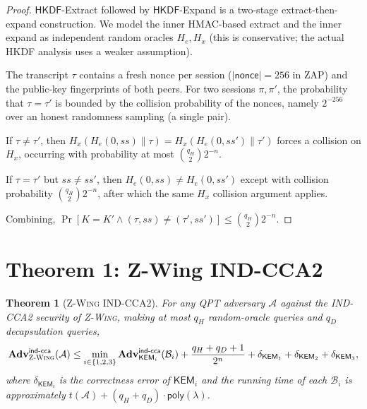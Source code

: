 \documentclass[11pt,a4paper]{article}
\newtheorem{theorem}{Theorem}
\theoremstyle{definition}
\theoremstyle{remark}
\newcommand{\KEM}{\ensuremath{\mathsf{KEM}}}
\newcommand{\Adv}{\ensuremath{\mathbf{Adv}}}
\newcommand{\zwing}{\textsc{Z-Wing}}
\newcommand{\zap}{\textsc{ZAP}}
\newcommand{\hkdf}{\ensuremath{\mathsf{HKDF}}}
\begin{document}
\begin{proof}
$\hkdf$-Extract followed by $\hkdf$-Expand is a two-stage extract-then-expand
construction. We model the inner HMAC-based extract and the inner expand as
independent random oracles $H_e, H_x$ (this is conservative; the actual
HKDF analysis \cite{krawczyk2010hkdf} uses a weaker assumption).

The transcript $\tau$ contains a fresh nonce per session
($|\mathsf{nonce}| = 256$ in \zap{}) and the public-key fingerprints of both
peers. For two sessions $\pi, \pi'$, the probability that
$\tau = \tau'$ is bounded by the collision probability of the nonces, namely
$2^{-256}$ over an honest randomness sampling (a single pair).

If $\tau \neq \tau'$, then $H_x(H_e(0, ss) \parallel \tau) = H_x(H_e(0, ss') \parallel \tau')$
forces a collision on $H_x$, occurring with probability at most
$\binom{q_H}{2} 2^{-n}$.

If $\tau = \tau'$ but $ss \neq ss'$, then $H_e(0, ss) \neq H_e(0, ss')$ except
with collision probability $\binom{q_H}{2} 2^{-n}$, after which the same
$H_x$ collision argument applies.

Combining, $\Pr[K = K' \wedge (\tau, ss) \neq (\tau', ss')] \le \binom{q_H}{2} 2^{-n}$.
\qedhere
\end{proof}

\section{Theorem 1: Z-Wing IND-CCA2}\label{sec:thm1}

\begin{theorem}[\zwing{} IND-CCA2]\label{thm:zw-cca}
For any QPT adversary $\mathcal{A}$ against the IND-CCA2 security of \zwing{},
making at most $q_H$ random-oracle queries and $q_D$ decapsulation queries,
\[
\Adv^{\mathsf{ind\text{-}cca}}_{\zwing}(\mathcal{A}) \le
\min_{i \in \{1,2,3\}} \Adv^{\mathsf{ind\text{-}cca}}_{\KEM_i}(\mathcal{B}_i) +
\frac{q_H + q_D + 1}{2^n} +
\delta_{\KEM_1} + \delta_{\KEM_2} + \delta_{\KEM_3},
\]
where $\delta_{\KEM_i}$ is the correctness error of $\KEM_i$ and the running
time of each $\mathcal{B}_i$ is approximately $t(\mathcal{A}) + (q_H + q_D) \cdot \mathsf{poly}(\lambda)$.
\end{theorem}
\end{document}
